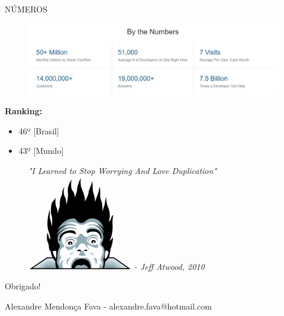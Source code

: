 \documentclass{Alexandre}
\begin{document}
\begin{frame}{NÚMEROS}

    \begin{figure}
        \includegraphics[scale = 0.35]{Figuras/Numeros.jpg}
    \end{figure}
    
    \textbf{Ranking: }
    \begin{itemize}
        \item  46º [Brasil]   
        \item  43º [Mundo]
    \end{itemize}

\end{frame}


\begin{frame}
    \begin{center}
        \begin{figure}{\textit{"I Learned to Stop Worrying And Love Duplication"}}
            \includegraphics[scale = 0.45]{Figuras/Jeff.png}
            \textit{ - Jeff Atwood, 2010}
        \end{figure}
    \vspace{1.5cm}

    \begin{Huge} 
    Obrigado!\\
    \end{Huge}
    \bigskip
    Alexandre Mendonça Fava - \alert{alexandre.fava@hotmail.com}\\
    \end{center}
\end{frame}
\end{document}
